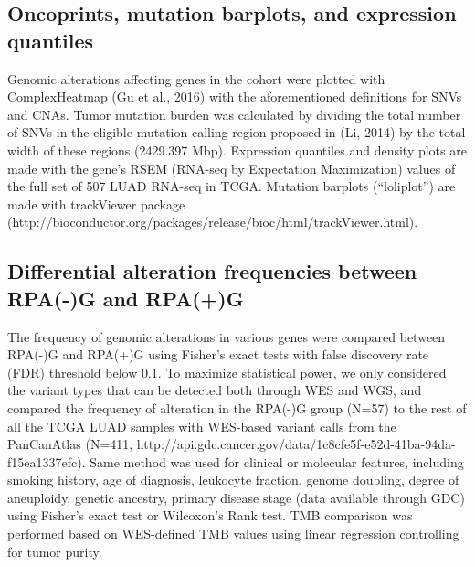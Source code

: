 \documentclass[phd,tocprelim]{cornell}
\begin{document}
\subsection*{Oncoprints, mutation barplots, and expression quantiles}
Genomic alterations affecting genes in the cohort were plotted with ComplexHeatmap (Gu et al., 2016) with the aforementioned definitions for SNVs and CNAs. Tumor mutation burden was calculated by dividing the total number of SNVs in the eligible mutation calling region proposed in (Li, 2014) by the total width of these regions (2429.397 Mbp). Expression quantiles and density plots are made with the gene’s RSEM (RNA-seq by Expectation Maximization) values of the full set of 507 LUAD RNA-seq in TCGA. Mutation barplots (“loliplot”) are made with trackViewer package (http://bioconductor.org/packages/release/bioc/html/trackViewer.html).

\subsection*{Differential alteration frequencies between RPA(-)G and RPA(+)G}
The frequency of genomic alterations in various genes were compared between RPA(-)G and RPA(+)G using Fisher’s exact tests with false discovery rate (FDR) threshold below 0.1. To maximize statistical power, we only considered the variant types that can be detected both through WES and WGS, and compared the frequency of alteration in the RPA(-)G group (N=57) to the rest of all the TCGA LUAD samples with WES-based variant calls from the PanCanAtlas (N=411, http://api.gdc.cancer.gov/data/1c8cfe5f-e52d-41ba-94da-f15ea1337efc). Same method was used for clinical or molecular features, including smoking history, age of diagnosis, leukocyte fraction, genome doubling, degree of aneuploidy, genetic ancestry, primary disease stage (data available through GDC) using Fisher’s exact test or Wilcoxon’s Rank test. TMB comparison was performed based on WES-defined TMB values using linear regression controlling for tumor purity. 
\end{document}
